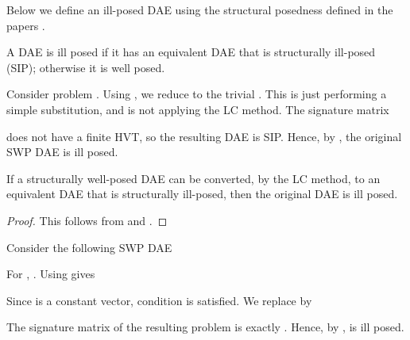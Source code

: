 Below we define an ill-posed DAE using the structural posedness defined in the \daesa papers \cite{NedialkovPryce2012a,NedialkovPryce2012b}.
\begin{definition}\label{df:illposed}
A DAE is ill posed if it has an equivalent DAE that is structurally ill-posed (SIP); otherwise it is well posed.
\end{definition}

\begin{example}
Consider problem . Using , we reduce  to the trivial . This is just performing a simple substitution, and is not applying the LC method.
The signature matrix

 does not have a finite HVT, so the resulting DAE is SIP. Hence, by  , the original SWP DAE   is ill posed.
\end{example}

\begin{corollary}\label{co:illposed}
If a structurally well-posed DAE can be converted, by the LC method, to an equivalent DAE that is structurally ill-posed, then the original DAE is ill posed.
\end{corollary}

\begin{proof}
This follows from  and .
\end{proof}

\begin{example}\label{ex:pendmess2}
Consider the following SWP DAE



For , . Using  gives

Since  is a constant vector, condition  is satisfied. We replace  by

The signature matrix of the resulting problem is exactly . Hence, by ,  is ill posed.
\end{example}



